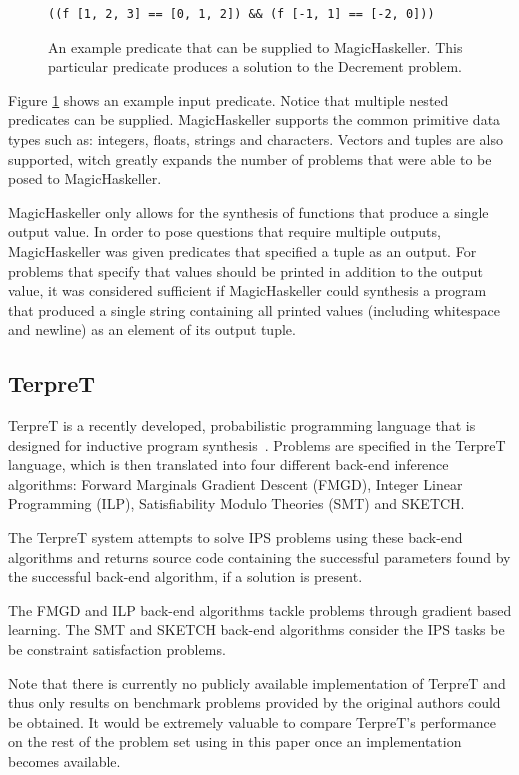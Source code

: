 \begin{figure}
\begin{verbatim}
((f [1, 2, 3] == [0, 1, 2]) && (f [-1, 1] == [-2, 0]))  
\end{verbatim}
\caption{An example predicate that can be supplied to MagicHaskeller. This particular predicate produces a solution to the Decrement problem.}
\label{fig:MHpred}
\end{figure}

Figure \ref{fig:MHpred} shows an example input predicate. Notice that multiple nested predicates can be supplied. MagicHaskeller supports the common primitive data types such as: integers, floats, strings and characters. Vectors and tuples are also supported, witch greatly expands the number of problems that were able to be posed to MagicHaskeller.

MagicHaskeller only allows for the synthesis of functions that produce a single output value. In order to pose questions that require multiple outputs, MagicHaskeller was given predicates that specified a tuple as an output. For problems that specify that values should be printed in addition to the output value, it was considered sufficient if MagicHaskeller could synthesis a program that produced a single string containing all printed values (including whitespace and newline) as an element of its output tuple.

\subsection{TerpreT}

TerpreT is a recently developed, probabilistic programming language that is designed for inductive program synthesis~\cite{Gaunt2016}. Problems are specified in the TerpreT language, which is then translated into four different back-end inference algorithms: Forward Marginals Gradient Descent (FMGD), Integer Linear Programming (ILP), Satisfiability Modulo Theories (SMT) and SKETCH.

The TerpreT system attempts to solve IPS problems using these back-end algorithms and returns source code containing the successful parameters found by the successful back-end algorithm, if a solution is present.

The FMGD and ILP back-end algorithms tackle problems through gradient based learning. The SMT and SKETCH back-end algorithms consider the IPS tasks be be  constraint satisfaction problems.

Note that there is currently no publicly available implementation of TerpreT and thus only results on benchmark problems provided by the original authors could be obtained. It would be extremely valuable to compare TerpreT's performance on the rest of the problem set using in this paper once an implementation becomes available.

